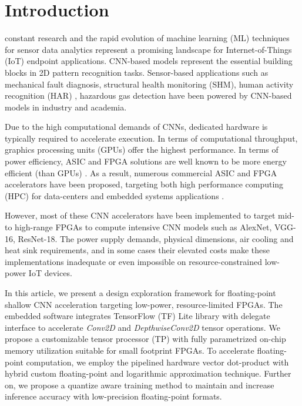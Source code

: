 
\section{Introduction}
\label{sec:introduction}

 constant research and the rapid evolution of machine learning (ML) techniques for sensor data analytics represent a promising landscape for Internet-of-Things (IoT) endpoint applications. CNN-based models represent the essential building blocks in 2D pattern recognition tasks. Sensor-based applications such as mechanical fault diagnosis\cite{li2019sensor,dong2018rolling}, structural health monitoring (SHM)\cite{nagayama2007structural}, human activity recognition (HAR) \cite{wang2019deep}, hazardous gas detection\cite{kim2017hazardous} have been powered by CNN-based models in industry and academia.

Due to the high computational demands of CNNs, dedicated hardware is typically required to accelerate execution. In terms of computational throughput, graphics processing units (GPUs) offer the highest performance. In terms of power efficiency, ASIC and FPGA solutions are well known to be more energy efficient (than GPUs) \cite{nurvitadhi2017can}. As a result, numerous commercial ASIC and FPGA accelerators have been proposed, targeting both high performance computing (HPC) for data-centers and embedded systems applications \cite{abdelouahab2018accelerating}.

However, most of these CNN accelerators have been implemented to target mid- to high-range FPGAs to compute intensive CNN models such as AlexNet, VGG-16, ResNet-18. The power supply demands, physical dimensions, air cooling and heat sink requirements, and in some cases their elevated costs make these implementations inadequate or even impossible on resource-constrained low-power IoT devices.

In this article, we present a design exploration framework for floating-point shallow CNN acceleration targeting low-power, resource-limited FPGAs. The embedded software integrates TensorFlow (TF) Lite library with delegate interface to accelerate \emph{Conv2D} and \emph{DepthwiseConv2D} tensor operations. We propose a customizable tensor processor (TP) with fully parametrized on-chip memory utilization suitable for small footprint FPGAs. To accelerate floating-point computation, we employ the pipelined hardware vector dot-product with hybrid custom floating-point and logarithmic approximation technique\cite{nevarez2021accelerating}. Further on, we propose a quantize aware training method to maintain and increase inference accuracy with low-precision floating-point formats.

